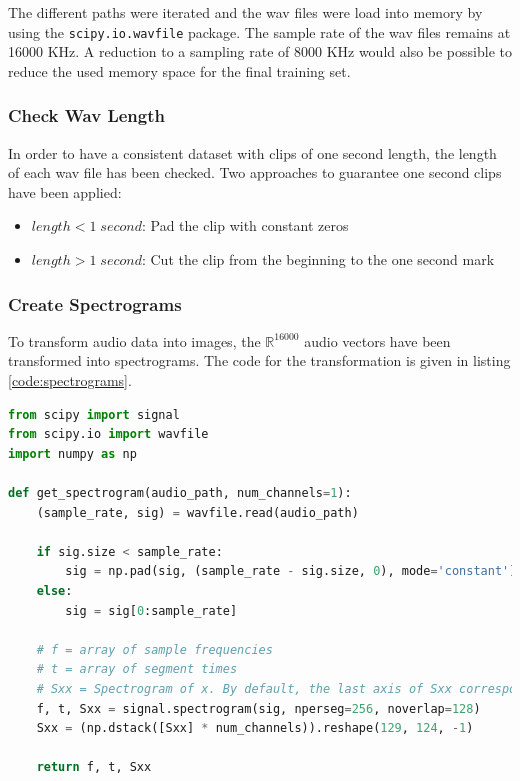 \documentclass{article}
\theoremstyle{definition}
\theoremstyle{remark}
\begin{document}
The different paths were iterated and the wav files were load into memory by using the \texttt{scipy.io.wavfile} package. The sample rate of the wav files remains at 16000 KHz.  A reduction to a sampling rate of 8000 KHz would also be possible to reduce the used memory space for the final training set.


\subsubsection{Check Wav Length}

In order to have a consistent dataset with clips of one second length, the length of each wav file has been checked. Two approaches to guarantee one second clips have been applied:

\begin{itemize}
	\item $length < 1 \; second$: Pad the clip with constant zeros
	\item $length > 1 \; second$: Cut the clip from the beginning to the one second mark
\end{itemize}
 

\subsubsection{Create Spectrograms}

To transform audio data into images, the $\mathbb{R}^{16000}$ audio vectors have been transformed into spectrograms. The code for the transformation is given in listing \ref{code:spectrograms}.



\begin{lstlisting}[language=Python, caption=Get spectrogram code, label=code:spectrograms]
from scipy import signal
from scipy.io import wavfile
import numpy as np

def get_spectrogram(audio_path, num_channels=1):
    (sample_rate, sig) = wavfile.read(audio_path)

    if sig.size < sample_rate:
        sig = np.pad(sig, (sample_rate - sig.size, 0), mode='constant')
    else:
        sig = sig[0:sample_rate]

    # f = array of sample frequencies
    # t = array of segment times
    # Sxx = Spectrogram of x. By default, the last axis of Sxx corresponds to the segment times.
    f, t, Sxx = signal.spectrogram(sig, nperseg=256, noverlap=128)
    Sxx = (np.dstack([Sxx] * num_channels)).reshape(129, 124, -1)

    return f, t, Sxx
\end{lstlisting}
\end{document}
